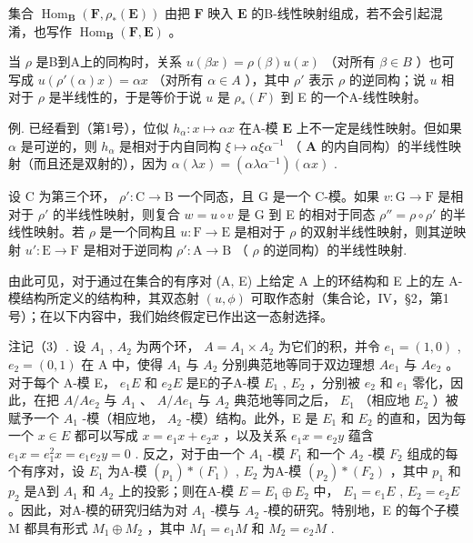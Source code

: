 集合 \(\operatorname{Hom}_{\mathbf{B}}(\mathbf{F},\rho_{*}(\mathbf{E}))\) 由把 \(\mathbf{F}\) 映入 \(\mathbf{E}\) 的B-线性映射组成，若不会引起混淆，也写作 \(\operatorname{Hom}_{\mathbf{B}}(\mathbf{F},\mathbf{E})\) 。

当 \(\rho\) 是B到A上的同构时，关系 \(u(\beta x) = \rho(\beta) u(x)\) （对所有 \(\beta \in B\) ）也可写成 \(u(\rho'(\alpha)x) = \alpha x\) （对所有 \(\alpha \in A\) ），其中 \(\rho'\) 表示 \(\rho\) 的逆同构；说 \(u\) 相对于 \(\rho\) 是半线性的，于是等价于说 \(u\) 是 \(\rho_*(F)\) 到 E 的一个A-线性映射。

例. 已经看到（第1号），位似 \(h_{\alpha} \colon x \mapsto \alpha x\) 在A-模 \(\mathbf{E}\) 上不一定是线性映射。但如果 \(\alpha\) 是可逆的，则 \(h_{\alpha}\) 是相对于内自同构 \(\xi \mapsto \alpha \xi \alpha^{-1}\) （ \(\mathbf{A}\) 的内自同构）的半线性映射（而且还是双射的），因为 \(\alpha(\lambda x) = (\alpha \lambda \alpha^{-1})(\alpha x)\) .

设 C 为第三个环， \(\rho':\mathrm{C}\to\mathrm{B}\) 一个同态，且 G 是一个 C-模。如果 \(v:\mathrm{G}\to\mathrm{F}\) 是相对于 \(\rho'\) 的半线性映射，则复合 \(w=u\circ v\) 是 G 到 E 的相对于同态 \(\rho''=\rho\circ\rho'\) 的半线性映射。若 \(\rho\) 是一个同构且 \(u:\mathrm{F}\to\mathrm{E}\) 是相对于 \(\rho\) 的双射半线性映射，则其逆映射 \(u':\mathrm{E}\to\mathrm{F}\) 是相对于逆同构 \(\rho':\mathrm{A}\to\mathrm{B}\) （ \(\rho\) 的逆同构）的半线性映射.

由此可见，对于通过在集合的有序对 (A, E) 上给定 A 上的环结构和 E 上的左 A-模结构所定义的结构种，其双态射 \((u, \phi)\) 可取作态射（集合论，IV，§2，第1号）；在以下内容中，我们始终假定已作出这一态射选择。

注记（3）. 设 \(A_{1}\) , \(A_{2}\) 为两个环， \(A = A_{1} \times A_{2}\) 为它们的积，并令 \(e_{1} = (1, 0)\) , \(e_{2} = (0, 1)\) 在 A 中，使得 \(A_{1}\) 与 \(A_{2}\) 分别典范地等同于双边理想 \(Ae_{1}\) 与 \(Ae_{2}\) 。对于每个 A-模 E， \(e_{1}E\) 和 \(e_{2}E\) 是E的子A-模 \(E_{1}\) , \(E_{2}\) ，分别被 \(e_{2}\) 和 \(e_{1}\) 零化，因此，在把 \(A/Ae_{2}\) 与 \(A_{1}\) 、 \(A/Ae_{1}\) 与 \(A_{2}\) 典范地等同之后， \(E_{1}\) （相应地 \(E_{2}\) ）被赋予一个 \(A_{1}\) -模（相应地， \(A_{2}\) -模）结构。此外，E 是 \(E_{1}\) 和 \(E_{2}\) 的直和，因为每一个 \(x \in E\) 都可以写成 \(x = e_{1}x + e_{2}x\) ，以及关系 \(e_{1}x = e_{2}y\) 蕴含 \(e_{1}x = e_{1}^{2}x = e_{1}e_{2}y = 0\) . 反之，对于由一个 \(A_{1}\) -模 \(F_{1}\) 和一个 \(A_{2}\) -模 \(F_{2}\) 组成的每个有序对，设 \(E_{1}\) 为A-模 \((p_{1}) * (F_{1})\) , \(E_{2}\) 为A-模 \((p_{2}) * (F_{2})\) ，其中 \(p_{1}\) 和 \(p_{2}\) 是A到 \(A_{1}\) 和 \(A_{2}\) 上的投影；则在A-模 \(E = E_{1} \oplus E_{2}\) 中， \(E_{1} = e_{1}E\) , \(E_{2} = e_{2}E\) 。因此，对A-模的研究归结为对 \(A_{1}\) -模与 \(A_{2}\) -模的研究。特别地，E 的每个子模 M 都具有形式 \(M_{1} \oplus M_{2}\) ，其中 \(M_{1} = e_{1}M\) 和 \(M_{2} = e_{2}M\) .

